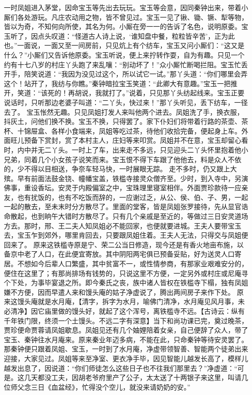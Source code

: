\documentclass[12pt,oneside]{book}
\begin{document}
一时凤姐进入茅堂，因命宝玉等先出去玩玩。宝玉等会意，因同秦钟出来，带着小厮们各处游玩。凡庄农动用之物，皆不曾见过。宝玉一见了锹、锄、镢、犁等物，皆以为奇，不知何向所使，其名为何。小厮在旁一一的告诉了名色，说明原委。宝玉听了，因点头叹道：“怪道古人诗上说，‘谁知盘中餐，粒粒皆辛苦’，正为此也。”一面说，一面又至一间房前，只见炕上有个纺车，宝玉又问小厮们：“这又是什么？”小厮们又告诉他原委。宝玉听说，便上来拧转作耍，自为有趣。只见一个约有十七八岁的村庄丫头跑了来乱嚷：“别动坏了！”众小厮忙断喝拦阻。宝玉忙丢开手，陪笑说道：“我因为没见过这个，所以试它一试。”那丫头道：“你们哪里会弄这个！站开了，我纺与你瞧。”秦钟暗拉宝玉笑道：“此卿大有意趣。”宝玉一把推开，笑道：“该死的！再胡说，我就打了。”说着，只见那丫头纺起线来。宝玉正要说话时，只听那边老婆子叫道：“二丫头，快过来！”那丫头听见，丢下纺车，一径去了。
宝玉怅然无趣。只见凤姐打发人来叫他两个进去。凤姐洗了手，换衣服，抖灰土，问他们换不换。宝玉不换，只得罢了。家下仆妇们将带着行路的茶壶、茶杯、十锦屉盒、各样小食端来，凤姐等吃过茶，待他们收拾完备，便起身上车。外面旺儿预备下赏封，赏了本村主人，庄妇等来叩赏。凤姐并不在意，宝玉却留心看时，内中并无二丫头。一时上了车，出来走不多远，只见迎头二丫头怀里抱着他小兄弟，同着几个小女孩子说笑而来。宝玉恨不得下车跟了他他去，料是众人不依的，少不得以目相送，争奈车轻马快，一时展眼无踪。
走不多时，仍又跟上大殡。早有前面法鼓金铙、幢幡宝盖，铁槛寺接灵众僧齐至。少时，到入寺中，另演佛事，重设香坛。安灵于内殿偏室之中，宝珠理里寝室相伴。外面贾珍款待一应亲友，也有扰饭的，也有不吃饭而辞的，一应谢过乏，从公、侯、伯、子、男，一起一起的散去，至未末时分方散尽了。里面的堂客，皆是凤姐张罗接待，先从显官诰命散起，也到晌午大错时方散尽了。只有几个亲戚是至近的，等做过三日安灵道场方去。那时，邢、王二夫人知凤姐必不能回家，也便就要进城。王夫人要带宝玉去，宝玉乍到郊外，哪里肯回去，只要跟凤姐住着。王夫人无法，只得交与凤姐便回来了。
原来这铁槛寺原是宁、荣二公当日修造，现今还是有香火地亩布施，以备京中老了人口，在此便宜寄放。其中阴阳两宅俱已预备妥贴，好为送灵人口寄居。不想如今后辈人口繁盛，其中贫富不一，或性情参商，有那家业艰难安分的，便住在这里了；有那尚排场有钱势的，只说这里不方便，一定另外或村庄或尼庵寻个下处，为事毕宴退之所。即今秦氏之丧，族中诸人皆权在铁槛寺下榻，独有凤姐嫌不方便，因而早遣人来和馒头庵的姑子净虚说了，腾出两间房子来作下处。
原来这馒头庵就是水月庵，【清字，拆字为水月，喻佛门清净，水月庵见风月事，未必清净】因它庙里做的馒头好，就起了这个浑号，离铁槛寺不远。【古诗云：纵有千年铁门限，终须一个土馒头。不远二字有深意】当下和尚功课已完，奠过晚茶，贾珍便命贾蓉请凤姐歇息。凤姐见还有几个妯娌陪着女亲，自己便辞了众人，带了宝玉、秦钟往水月庵来。原来秦业年迈多病，不能在此，只命秦钟等待安灵罢了。那秦钟便只跟着凤姐、宝玉，一时到了水月庵，净虚带领智善、智能两个徒弟出来迎接，大家见过。凤姐等来至净室、更衣净手毕，因见智能儿越发长高了，模样儿越发出息了，因说道：“你们师徒怎么这些日子也不往我们那里去？”净虚道：“可是。这几天都没工夫，因胡老爷府里产了公子，太太送了十两银子来这里，叫请几位师父念三日《血盆经》，忙得没个空儿，就没来请奶奶的安。”
\end{document}
